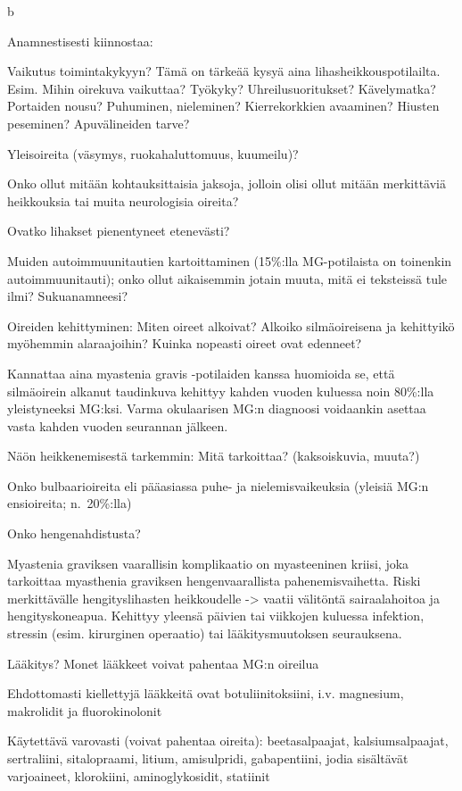 \documentclass[
]{book}
\begin{document}
b

Anamnestisesti kiinnostaa:

Vaikutus toimintakykyyn? Tämä on tärkeää kysyä aina lihasheikkouspotilailta. Esim. Mihin oirekuva vaikuttaa? Työkyky? Uhreilusuoritukset? Kävelymatka? Portaiden nousu? Puhuminen, nieleminen? Kierrekorkkien avaaminen? Hiusten peseminen? Apuvälineiden tarve?

Yleisoireita (väsymys, ruokahaluttomuus, kuumeilu)?

Onko ollut mitään kohtauksittaisia jaksoja, jolloin olisi ollut mitään merkittäviä heikkouksia tai muita neurologisia oireita?

Ovatko lihakset pienentyneet etenevästi?

Muiden autoimmuunitautien kartoittaminen (15\%:lla MG-potilaista on toinenkin autoimmuunitauti); onko ollut aikaisemmin jotain muuta, mitä ei teksteissä tule ilmi? Sukuanamneesi?

Oireiden kehittyminen: Miten oireet alkoivat? Alkoiko silmäoireisena ja kehittyikö myöhemmin alaraajoihin? Kuinka nopeasti oireet ovat edenneet?

Kannattaa aina myastenia gravis -potilaiden kanssa huomioida se, että silmäoirein alkanut taudinkuva kehittyy kahden vuoden kuluessa noin 80\%:lla yleistyneeksi MG:ksi. Varma okulaarisen MG:n diagnoosi voidaankin asettaa vasta kahden vuoden seurannan jälkeen.

Näön heikkenemisestä tarkemmin: Mitä tarkoittaa? (kaksoiskuvia, muuta?)

Onko bulbaarioireita eli pääasiassa puhe- ja nielemisvaikeuksia (yleisiä MG:n ensioireita; n.~20\%:lla)

Onko hengenahdistusta?

Myastenia graviksen vaarallisin komplikaatio on myasteeninen kriisi, joka tarkoittaa myasthenia graviksen hengenvaarallista pahenemisvaihetta. Riski merkittävälle hengityslihasten heikkoudelle -\textgreater{} vaatii välitöntä sairaalahoitoa ja hengityskoneapua. Kehittyy yleensä päivien tai viikkojen kuluessa infektion, stressin (esim. kirurginen operaatio) tai lääkitysmuutoksen seurauksena.

Lääkitys? Monet lääkkeet voivat pahentaa MG:n oireilua

Ehdottomasti kiellettyjä lääkkeitä ovat botuliinitoksiini, i.v. magnesium, makrolidit ja fluorokinolonit

Käytettävä varovasti (voivat pahentaa oireita): beetasalpaajat, kalsiumsalpaajat, sertraliini, sitalopraami, litium, amisulpridi, gabapentiini, jodia sisältävät varjoaineet, klorokiini, aminoglykosidit, statiinit
\end{document}

